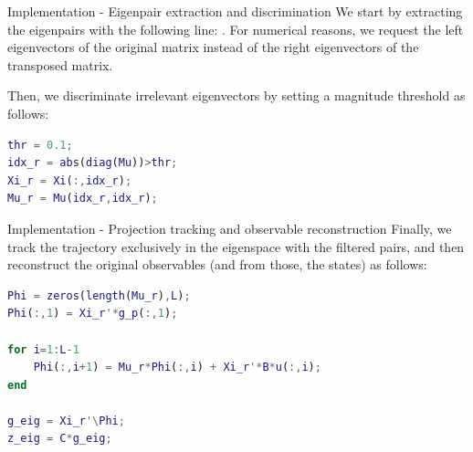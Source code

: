 \documentclass{beamer}
\begin{document}
\begin{frame}[fragile]{Implementation - Eigenpair extraction and discrimination}
    We start by extracting the eigenpairs with the following line: . For numerical reasons, we request the left eigenvectors of the original matrix instead of the right eigenvectors of the transposed matrix.

    Then, we discriminate irrelevant eigenvectors by setting a magnitude threshold as follows:

    \begin{lstlisting}[language=Matlab]
thr = 0.1;
idx_r = abs(diag(Mu))>thr;
Xi_r = Xi(:,idx_r);
Mu_r = Mu(idx_r,idx_r);
    \end{lstlisting}    
\end{frame}

\begin{frame}[fragile]{Implementation - Projection tracking and observable reconstruction}
    Finally, we track the trajectory exclusively in the eigenspace with the filtered pairs, and then reconstruct the original observables (and from those, the states) as follows:

    \begin{lstlisting}[language=Matlab]
Phi = zeros(length(Mu_r),L);
Phi(:,1) = Xi_r'*g_p(:,1);

for i=1:L-1
    Phi(:,i+1) = Mu_r*Phi(:,i) + Xi_r'*B*u(:,i);
end

g_eig = Xi_r'\Phi;
z_eig = C*g_eig;
    \end{lstlisting}
\end{frame}
\end{document}
